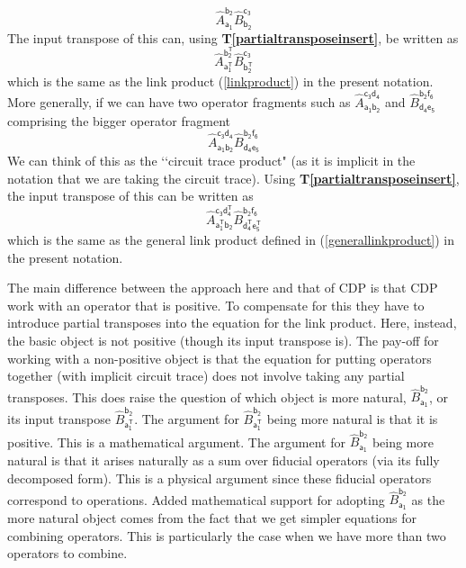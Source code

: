 \documentclass[10pt]{article}
\begin{document}
\begin{equation}
\hat A_\mathsf{a_1}^\mathsf{b_2}\hat B_\mathsf{b_2}^\mathsf{c_3}
\end{equation}
The input transpose of this can, using {\bf T\ref{partialtransposeinsert}}, be written as
\begin{equation}
\hat A_\mathsf{a^T_1}^\mathsf{b^T_2}\hat B_\mathsf{b^T_2}^\mathsf{c_3}
\end{equation}
which is the same as the link product (\ref{linkproduct}) in the present notation.  More generally, if we can have two operator fragments such as $\hat A_\mathsf{a_1b_2}^\mathsf{c_3d_4}$ and $\hat B_\mathsf{d_4e_5}^\mathsf{b_2f_6}$ comprising the bigger operator fragment
\begin{equation}
\hat A_\mathsf{a_1b_2}^\mathsf{c_3d_4}\hat B_\mathsf{d_4e_5}^\mathsf{b_2f_6}
\end{equation}
We can think of this as the \lq\lq circuit trace product" (as it is implicit in the notation that we are taking the circuit trace).  Using {\bf T\ref{partialtransposeinsert}}, the input transpose of this can be written as
\begin{equation}
\hat A_\mathsf{a^T_1b_2}^\mathsf{c_3d^T_4}\hat B_\mathsf{d^T_4e^T_5}^\mathsf{b_2f_6}
\end{equation}
which is the same as the general link product defined in (\ref{generallinkproduct}) in the present notation.

The main difference between the approach here and that of CDP is that CDP work with an operator that is positive.  To compensate for this they have to introduce partial transposes into the equation for the link product.  Here, instead, the basic object is not positive (though its input transpose is).  The pay-off for working with a non-positive object is that the equation for putting operators together (with implicit circuit trace) does not involve taking any partial transposes.
This does raise the question of which object is more natural, $\hat B_\mathsf{a_1}^\mathsf{b_2}$, or its input transpose $\hat B_\mathsf{a^T_1}^\mathsf{b_2}$.  The argument for $\hat B_\mathsf{a^T_1}^\mathsf{b_2}$ being more natural is that it is positive. This is a mathematical argument. The argument for $\hat B_\mathsf{a_1}^\mathsf{b_2}$ being more natural is that it arises naturally as a sum over fiducial operators (via its fully decomposed form).  This is a physical argument since these fiducial operators correspond to operations. Added mathematical support for adopting $\hat B_\mathsf{a_1}^\mathsf{b_2}$ as the more natural object comes from the fact that we get simpler equations for combining operators.  This is particularly the case when we have more than two operators to combine.
\end{document}
